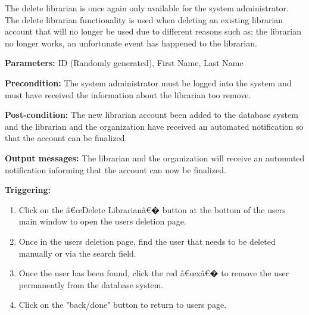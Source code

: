 The delete librarian is once again only available for the system administrator. The delete librarian functionality is used when deleting an existing librarian account that will no longer be used due to different reasons such as; the librarian no longer works, an unfortunate event has happened to the librarian.

\begin{description}

\item \textbf{Parameters:} ID (Randomly generated), First Name, Last Name

\item \textbf{Precondition:} The system administrator must be logged into the system and must have received the information about the librarian too remove. 

\item \textbf{Post-condition:} The new librarian account been added to the database system and the librarian and the organization have received an automated notification so that the account can be finalized. 

\item \textbf{Output messages:} The librarian and the organization will receive an automated notification informing that the account can now be finalized. 

\item \textbf{Triggering:}
\begin{enumerate}

\item Click on the â€œDelete Librarianâ€� button at the bottom of the users main window to open the users deletion page.

\item Once in the users deletion page, find the user that needs to be deleted manually or via the search field.

\item Once the user has been found, click the red â€œxâ€� to remove the user permanently from the database system. 

\item Click on the "back/done" button to return to users page.

\end{enumerate}

\end{description}